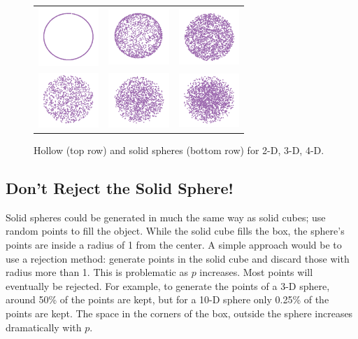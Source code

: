 \documentclass[a4paper]{report}
\begin{document}
\begin{article}
\begin{figure}[ht]
\centering
\begin{tabular}{c c c}
\includegraphics[width=0.9in]{sphere-2.pdf} 
&\includegraphics[width=0.9in]{sphere-3.pdf} 
&\includegraphics[width=0.9in]{sphere-4.pdf}
\\
\includegraphics[width=0.9in]{sphere-2-solid.pdf} 
&\includegraphics[width=0.9in]{sphere-3-solid.pdf} 
&\includegraphics[width=0.9in]{sphere-4-solid.pdf} 
\end{tabular}
\caption{Hollow (top row) and solid spheres (bottom row) for 2-D, 3-D,
  4-D.}
\label{holsolidsphere}
\end{figure}

\subsection{Don't Reject the Solid Sphere!}

Solid spheres could be generated in much the same way as solid cubes; use
random points to fill the object. While the solid cube fills the box,
the sphere's points are inside a radius of 1 from the center. A simple
approach would be to use a rejection method: generate points in the
solid cube and discard those with radius more than 1. This is
problematic as $p$ increases. Most points will eventually be rejected.
For example, to generate the points of a 3-D sphere, around 50\% of
the points are kept, but for a 10-D sphere only 0.25\% of the points
are kept. The space in the corners of the box, outside the sphere
increases dramatically with $p$.


\end{article}
\end{document}
